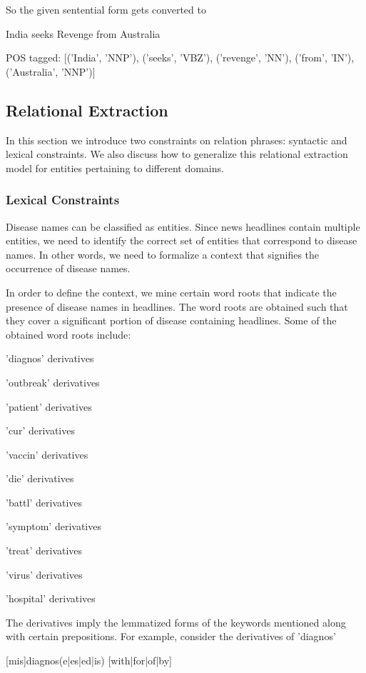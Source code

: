 \documentclass{article}
\begin{document}
So the given sentential form gets converted to 

India seeks Revenge from Australia

POS tagged: [('India', 'NNP'), ('seeks', 'VBZ'), ('revenge', 'NN'), ('from', 'IN'), ('Australia', 'NNP')]


\subsection{Relational Extraction}

In this section we introduce two constraints on relation phrases: syntactic and lexical constraints. We also discuss how to generalize this relational extraction model for entities pertaining to different domains. 

\subsubsection{Lexical Constraints}

Disease names can be classified as entities. Since news headlines contain multiple entities, we need to identify the correct set of entities that correspond to disease names. In other words, we need to formalize a context that signifies the occurrence of disease names. 

In order to define the context, we mine certain word roots that indicate the presence of disease names in headlines. The word roots are obtained such that they cover a significant portion of disease containing headlines. Some of the obtained word roots include: 

'diagnos' derivatives

'outbreak' derivatives

'patient' derivatives

'cur' derivatives

'vaccin' derivatives

'die' derivatives

'battl' derivatives

'symptom' derivatives

'treat' derivatives

'virus' derivatives

'hospital' derivatives

The derivatives imply the lemmatized forms of the keywords mentioned along with
certain prepositions. For example, consider the derivatives of 'diagnos'

[mis]diagnos(e|es|ed|is) [with|for|of|by]
\end{document}

